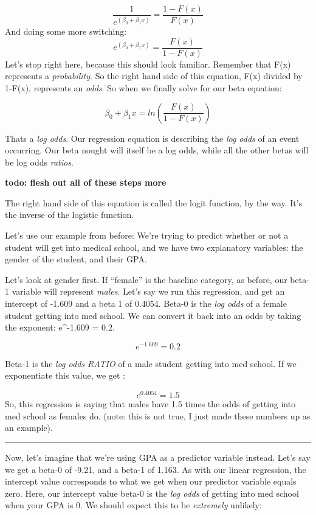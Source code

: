 \documentclass[]{article}
\begin{document}
\[ \frac{1}{e^{(\beta_0 + \beta_1x)}} = \frac{1-F(x)}{F(x)}   \] And
doing some more switching:
\[ e^{(\beta_0 + \beta_1x)} = \frac{F(x)}{1-F(x)}   \] Let's stop right
here, because this should look familiar. Remember that F(x) represents a
\emph{probability}. So the right hand side of this equation, F(x)
divided by 1-F(x), represents an \emph{odds}. So when we finally solve
for our beta equation:

\[ \beta_0 + \beta_1x = ln\left(\frac{F(x)}{1-F(x)} \right)  \]

Thats a \emph{log odds}. Our regression equation is describing the
\emph{log odds} of an event occurring. Our beta nought will itself be a
log odds, while all the other betas will be log odds \emph{ratios}.

\textbf{todo: flesh out all of these steps more}

The right hand side of this equation is called the logit function, by
the way. It's the inverse of the logistic function.

Let's use our example from before: We're trying to predict whether or
not a student will get into medical school, and we have two explanatory
variables: the gender of the student, and their GPA.

Let's look at gender first. If ``female'' is the baseline category, as
before, our beta-1 variable will represent \emph{males}. Let's say we
run this regression, and get an intercept of -1.609 and a beta 1 of
0.4054. Beta-0 is the \emph{log odds} of a female student getting into
med school. We can convert it back into an odds by taking the exponent:
e\^{}-1.609 = 0.2.

\[  e^{-1.609} = 0.2 \]

Beta-1 is the \emph{log odds RATIO} of a male student getting into med
school. If we exponentiate this value, we get :

\[  e^{0.4054} = 1.5 \] So, this regression is saying that males have
1.5 times the odds of getting into med school as females do. (note: this
is not true, I just made these numbers up as an example).

\begin{center}\rule{0.5\linewidth}{\linethickness}\end{center}

Now, let's imagine that we're using GPA as a predictor variable instead.
Let's say we get a beta-0 of -9.21, and a beta-1 of 1.163. As with our
linear regression, the intercept value corresponds to what we get when
our predictor variable equals zero. Here, our intercept value beta-0 is
the \emph{log odds} of getting into med school when your GPA is 0. We
should expect this to be \emph{extremely} unlikely:
\end{document}
